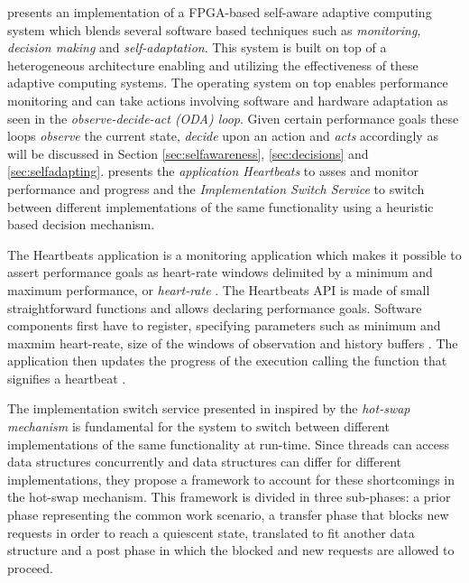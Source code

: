 %
\cite{selfaware} presents an implementation of a FPGA-based self-aware adaptive computing system which blends several software based techniques such as \emph{monitoring, decision making} and \emph{self-adaptation}. This system is built on top of a heterogeneous architecture enabling and utilizing the effectiveness of these adaptive computing systems. The operating system on top enables performance monitoring and can take actions involving software and hardware adaptation as seen in the \emph{observe-decide-act (ODA) loop}. Given certain performance goals these loops \emph{observe} the current state, \emph{decide} upon an action and \emph{acts} accordingly as will be discussed in Section \ref{sec:selfawareness}, \ref{sec:decisions} and \ref{sec:selfadapting}. \cite{selfaware} presents the \emph{application Heartbeats} to asses and monitor performance and progress and the \emph{Implementation Switch Service} to switch between different implementations of the same functionality using a heuristic based decision mechanism. 

The Heartbeats application is a monitoring application which makes it possible to assert performance goals as heart-rate windows delimited by a minimum and maximum performance, or \emph{heart-rate} \cite{evolvable}. The Heartbeats API is made of small straightforward functions and allows declaring performance goals. Software components first have to register, specifying parameters such as minimum and maxmim heart-reate, size of the windows of observation and history buffers \cite{selfaware}. The application then updates the progress of the execution calling the function that signifies a heartbeat \cite{evolvable}.

The implementation switch service presented in \cite{selfaware} inspired by the \emph{hot-swap mechanism} is fundamental for the system to switch between different implementations of the same functionality at run-time. Since threads can access data structures concurrently and data structures can differ for different implementations, they propose a framework to account for these shortcomings in the hot-swap mechanism.  This framework is divided in three sub-phases: a prior phase representing the common work scenario, a transfer phase that blocks new requests in order to reach a quiescent state, translated to fit another data structure and a post phase in which the blocked and new requests are allowed to proceed. 
